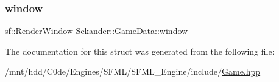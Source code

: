 \mbox{\label{structSekander_1_1GameData_a01dc93a762f8235e2e95eb2c79fa25fc}} 
\subsubsection{\texorpdfstring{window}{window}}
{\footnotesize\ttfamily sf\+::\+Render\+Window Sekander\+::\+Game\+Data\+::window}



The documentation for this struct was generated from the following file\+:\begin{DoxyCompactItemize}
\item 
/mnt/hdd/\+C0de/\+Engines/\+S\+F\+M\+L/\+S\+F\+M\+L\+\_\+\+Engine/include/\hyperlink{Game_8hpp}{Game.\+hpp}\end{DoxyCompactItemize}
